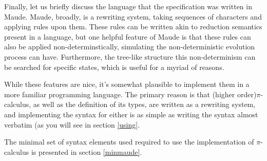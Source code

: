 Finally, let us briefly discuss the language that the specification was written in Maude. Maude, broadly, is a rewriting system, taking sequences of characters and applying rules upon them. These rules can be written akin to reduction semantics present in a language, but one helpful feature of Maude is that these rules can also be applied non-determinstically, simulating the non-deterministic evolution process can have. Furthermore, the tree-like structure this non-determinism can be searched for specific states, which is useful for a myriad of reasons.


While these features are nice, it's somewhat plausible to implement them in a more familiar programming language. The primary reason is that (higher order)$\pi$-calculus, as well as the definition of its types, are written as a rewriting system, and implementing the syntax for either is as simple as writing the syntax almost verbatim (as you will see in section \ref{using}.

The minimal set of syntax elements used required to use the implementation of $\pi$-calculus is presented in section \ref{minmaude}.